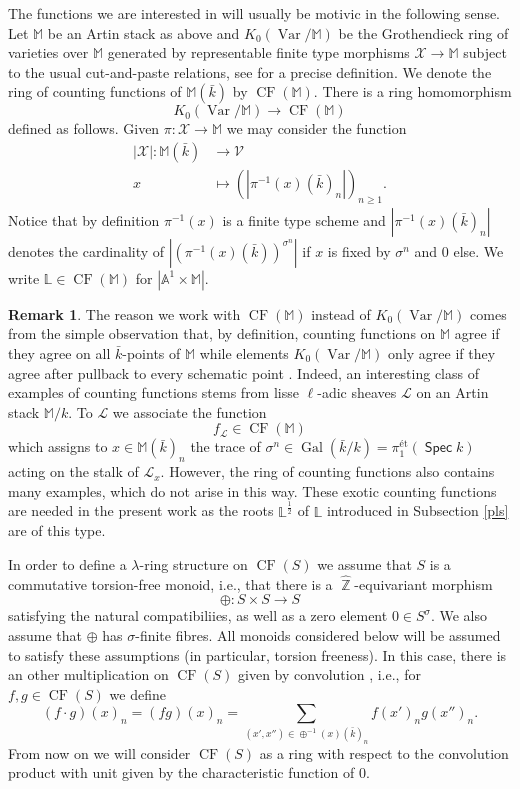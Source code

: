 \documentclass{article}
\DeclareMathOperator{\Zb}{\mathbb{Z}}
\DeclareMathOperator{\Gal}{Gal}
\DeclareMathOperator{\Spec}{\mathsf{Spec}}
\newcommand{\BA}{{\mathbb{A}}}
\newcommand{\BL}{{\mathbb{L}}}
\newcommand{\BM}{{\mathbb{M}}}
\newcommand{\CL}{{\mathcal L}}
\newcommand{\CV}{{\mathcal V}}
\newcommand{\CX}{{\mathcal X}}
\DeclareMathOperator{\mcf}{CF}
\DeclareMathOperator{\Var}{Var}
\theoremstyle{definition}
\newtheorem{rmk}[definition]{Remark}
\theoremstyle{plain}
\begin{document}
The functions we are interested in will usually be motivic in the following sense. Let $\BM$ be an Artin stack as above and $K_0(\Var/\BM)$ be the Grothendieck ring of varieties over $\BM$ generated by representable finite type morphisms $\CX \to \BM$ subject to the usual cut-and-paste relations, see \cite[Section 6.1]{MR19} for a precise definition. We denote the ring of counting functions of $\BM(\bar{k})$ by $\mcf(\BM)$. There is a ring homomorphism
\[K_0(\Var/\BM) \rightarrow \mcf(\BM)\]
defined as follows. Given $\pi: \CX \to \BM$ we may consider the function 
\begin{align*} |\CX|: \BM(\bar{k}) &\rightarrow \CV \\
  x &\mapsto (|\pi^{-1}(x)(\bar{k})_n|)_{n\geq 1}. 
\end{align*}
Notice that by definition $\pi^{-1}(x)$ is a finite type scheme and $|\pi^{-1}(x)(\bar{k})_n|$ denotes the cardinality of $|(\pi^{-1}(x)(\bar{k}))^{\sigma^n}|$ if $x$ is fixed by $\sigma^n$ and $0$ else. We write $\BL \in \mcf(\BM)$ for $|\BA^1\times \BM|$.

\begin{rmk} The reason we work with $\mcf(\BM)$ instead of $K_0(\Var/\BM)$ comes from the simple observation that, by definition, counting functions on $\BM$ agree if they agree on all $\bar{k}$-points of $\BM$ while elements $K_0(\Var/\BM)$ only agree if they agree after pullback to every schematic point \cite[Lemma 1.1.8]{CL16}. Indeed, an interesting class of examples of counting functions stems from lisse $\ell$-adic sheaves $\CL$ on an Artin stack $\BM/k$. To $\CL$ we associate the function 
$$f_{\CL}\in \mcf(\BM)$$
which assigns to $x \in \BM(\bar{k})_n$ the trace of $\sigma^n \in \Gal(\bar{k}/k)=\pi_1^{\text{\'et}}(\Spec k)$ acting on the stalk of $\CL_x$. However, the ring of counting functions also contains many examples, which do not arise in this way. These exotic counting functions are needed in the present work as the roots $\BL^{\frac{1}{2}}$ of $\BL$ introduced in Subsection \ref{pls} are of this type.
\end{rmk}


In order to define a $\lambda$-ring structure on $\mcf(S)$ we assume that $S$ is a commutative torsion-free monoid, i.e., that there is a $\widehat{\Zb}$-equivariant morphism
\[\oplus: S \times S \rightarrow S   \]
satisfying the natural compatibiliies, as well as a zero element $0 \in S^{\sigma}$. We also assume that $\oplus$ has $\sigma$-finite fibres. All monoids considered below will be assumed to satisfy these assumptions (in particular, torsion freeness). In this case, there is an other multiplication on $\mcf(S)$ given by convolution \cite[Section 4]{Me17b}, i.e., for $f,g \in \mcf(S)$ we define
\[ (f\cdot g)(x)_n = (fg)(x)_n = \sum_{(x',x'') \in \oplus^{-1}(x)(\bar{k})_n} f(x')_ng(x'')_n. \]
From now on we will consider $\mcf(S)$ as a ring with respect to the convolution product with unit given by the characteristic function of $0$. 
\end{document}
